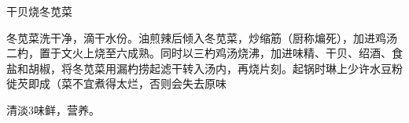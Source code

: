 \begin{recipe}{干贝烧冬苋菜}

\ingredients


\cooking

冬苋菜洗干净，滴干水份。油煎辣后倾入冬苋菜，炒缩筋（厨称煸死），加进鸡汤二杓，置于文火上烧至六成熟。同时以三杓鸡汤烧沸，加进味精、干贝、绍酒、食盐和胡椒，将冬苋菜用漏杓捞起滤干转入汤内，再烧片刻。起锅时琳上少许水豆粉徙芡即成（菜不宜煮得太烂，否则会失去原味

\notes

清淡3味鲜，营养。

\end{recipe}

